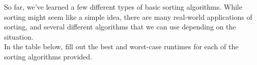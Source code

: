 \begin{blocksection}
So far, we've learned a few different types of basic sorting algorithms. While
sorting might seem like a simple idea, there are many real-world applications of
sorting, and several different algorithms that we can use depending on the situation.\\
In the table below, fill out the best and worst-case runtimes for each of the sorting algorithms provided.
\end{blocksection}